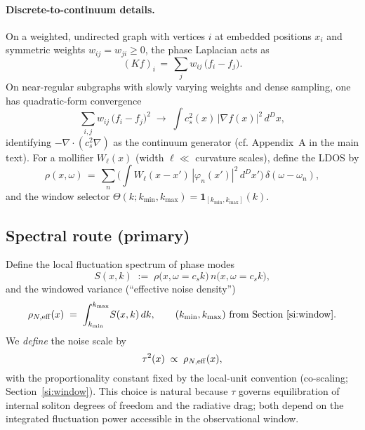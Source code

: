 \documentclass[11pt]{article}
\begin{document}
\paragraph{Discrete-to-continuum details.} On a weighted, undirected graph with vertices $i$ at embedded positions $x_i$ and symmetric weights $w_{ij}=w_{ji}\ge0$, the phase Laplacian acts as
\begin{equation}
  (K f)_i \,=\, \sum_{j} w_{ij}\,\big(f_i - f_j\big).
\end{equation}
On near-regular subgraphs with slowly varying weights and dense sampling, one has quadratic-form convergence
\begin{equation}
  \sum_{i,j} w_{ij}\,\big(f_i - f_j\big)^2 \;\longrightarrow\; \int c_s^2(x)\, |\nabla f(x)|^2\, d^D x,
\end{equation}
identifying $-\nabla\!\cdot(c_s^2\nabla)$ as the continuum generator (cf. Appendix~A in the main text). For a mollifier $W_\ell(x)$ (width $\ell\ll$ curvature scales), define the LDOS by
\begin{equation}
  \rho(x,\omega) \,=\, \sum_{n} \Big(\int W_\ell(x-x')\, |\varphi_n(x')|^2\, d^D x'\Big)\,\delta(\omega-\omega_n),
\end{equation}
and the window selector $\Theta(k;k_{\min},k_{\max})=\mathbf 1_{[k_{\min},k_{\max}]}(k)$.

\subsection*{Spectral route (primary)}
Define the local fluctuation spectrum of phase modes
\begin{equation}
  S(x,k) \;:=\; \rho\big(x,\omega=c_s k\big)\, n\big(x,\omega=c_s k\big),
\end{equation}
and the windowed variance (``effective noise density'')
\begin{equation}
  \rho_{N,\rm eff}(x) \;=\; \int_{k_{\min}}^{k_{\max}}\! S(x,k)\, dk,\qquad (k_{\min},k_{\max})~\text{from Section~\ref{si:window}}.
\end{equation}
We \emph{define} the noise scale by
\begin{equation}
  \tau^2(x) \;\propto\; \rho_{N,\rm eff}(x), \label{eq:tau-from-spectrum}
\end{equation}
with the proportionality constant fixed by the local-unit convention (co-scaling; Section~\ref{si:window}). This choice is natural because $\tau$ governs equilibration of internal soliton degrees of freedom and the radiative drag; both depend on the integrated fluctuation power accessible in the observational window.
\end{document}
